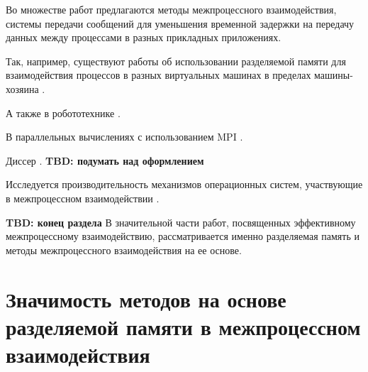 Во множестве работ предлагаются методы межпроцессного взаимодействия, системы передачи сообщений для уменьшения временной задержки на передачу данных между процессами \cite{7790679, ShMemTransportThesis} в разных прикладных приложениях.

Так, например, существуют работы об использовании разделяемой памяти для взаимодействия процессов в разных виртуальных машинах в пределах машины-хозяина \cite{IPCInterVirtualMachineShmem, IPCInterVirtualMachineShmemOptimizations, 10.1145/2847562, 10.1007/978-3-642-00955-6_7}.

А также в робототехнике \cite{5649358, Wang2019TZCEI}.

В параллельных вычислениях с использованием MPI \cite{4100356, 10.1007/11846802_19, 4663761, 4625853, 8665755}.

Диссер \cite{HPCInterCoreLinux}. \textbf{TBD: подумать над оформлением}

Исследуется производительность механизмов операционных систем, участвующие в межпроцессном взаимодействии \cite{MuxComparison, Smith2012DraftH, 8526899}.

%
%
%
%

\textbf{TBD: конец раздела}
В значительной части работ, посвященных эффективному межпроцессному взаимодействию, рассматривается именно разделяемая память и методы межпроцессного взаимодействия на ее основе.

\section{Значимость методов на основе разделяемой памяти в межпроцессном взаимодействия}

